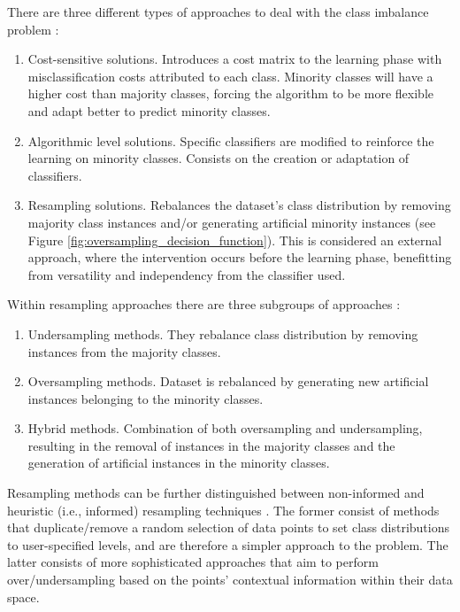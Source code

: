 \documentclass[parskip=full]{scrartcl}
\begin{document}
There are three different types of approaches to deal with the class imbalance
problem \cite{Fernandez2013,Kaur2019}:
\begin{enumerate}
	\item Cost-sensitive solutions. Introduces a cost matrix to the learning
	      phase with misclassification costs attributed to each class. Minority
	      classes will have a higher cost than majority classes, forcing the
	      algorithm to be more flexible and adapt better to predict minority
	      classes.
	\item Algorithmic level solutions. Specific classifiers are modified to
	      reinforce the learning on minority classes. Consists on the creation
	      or adaptation of classifiers.
	\item Resampling solutions. Rebalances the dataset's class distribution by
	      removing majority class instances and/or generating artificial
	      minority instances (see Figure
	      \ref{fig:oversampling_decision_function}). This is considered an
	      external  approach, where the intervention occurs before the learning
	      phase, benefitting from versatility and independency from the
	      classifier used.
\end{enumerate}

Within resampling approaches there are three subgroups of approaches
\cite{Fernandez2013,Kaur2019,Luengo2020}:
\begin{enumerate}
	\item Undersampling methods. They rebalance class distribution by removing
	      instances from the majority classes.
	\item Oversampling methods. Dataset is rebalanced by generating new
	      artificial instances belonging to the minority classes.
	\item Hybrid methods. Combination of both oversampling and undersampling,
	      resulting in the removal of instances in the majority classes and the
	      generation of artificial instances in the minority classes.
\end{enumerate}

Resampling methods can be further distinguished between non-informed and
heuristic (i.e., informed) resampling techniques
\cite{Fernandez2013,Luengo2020,Garcia2016}. The former consist of methods that
duplicate/remove a random selection of data points to set class distributions to
user-specified levels, and are therefore a simpler approach to the problem. The
latter consists of more sophisticated approaches that aim to perform
over/undersampling based on the points' contextual information within their data
space.
\end{document}
